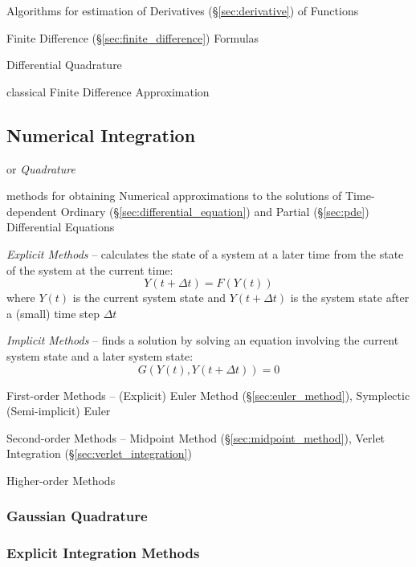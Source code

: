 {Algorithms for estimation of Derivatives (\S\ref{sec:derivative}) of Functions

Finite Difference (\S\ref{sec:finite_difference}) Formulas

Differential Quadrature

classical Finite Difference Approximation



\subsection{Numerical Integration}\label{sec:numerical_integration}

or \emph{Quadrature}

methods for obtaining Numerical approximations to the solutions of
Time-dependent Ordinary (\S\ref{sec:differential_equation}) and Partial
(\S\ref{sec:pde}) Differential Equations

\emph{Explicit Methods} -- calculates the state of a system at a later time
from the state of the system at the current time:
\[
  Y(t+\Delta{t}) = F(Y(t))
\]
where $Y(t)$ is the current system state and $Y(t + \Delta{t})$ is the system
state after a (small) time step $\Delta{t}$

\emph{Implicit Methods} -- finds a solution by solving an equation involving
the current system state and a later system state:
\[
  G(Y(t), Y(t + \Delta{t})) = 0
\]

First-order Methods -- (Explicit) Euler Method (\S\ref{sec:euler_method}),
Symplectic (Semi-implicit) Euler

Second-order Methods -- Midpoint Method (\S\ref{sec:midpoint_method}), Verlet
Integration (\S\ref{sec:verlet_integration})

Higher-order Methods



\subsubsection{Gaussian Quadrature}\label{sec:gaussian_quadrature}

\subsubsection{Explicit Integration Methods}\label{sec:explicit_integration}

}
